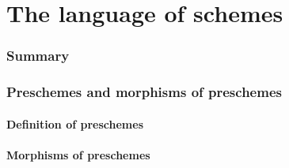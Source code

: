 \documentclass[10pt,oneside]{amsart}
\begin{document}
\clearpage


\part{The language of schemes}

    \section*{Summary}
    

    \section{Preschemes and morphisms of preschemes}

        \subsection{Definition of preschemes}
        

        \subsection{Morphisms of preschemes}
        
\end{document}
